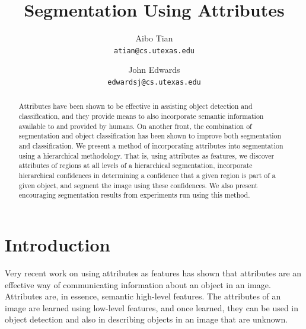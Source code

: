 \documentclass[10pt,twocolumn,letterpaper]{article}
\begin{document}
\title{Segmentation Using Attributes}

\author{Aibo Tian\\
{\tt\small atian@cs.utexas.edu}
\and
John Edwards\\
{\tt\small edwardsj@cs.utexas.edu}
}

\maketitle
\thispagestyle{empty}

\begin{abstract}
Attributes have been shown to be effective in assisting object detection and
classification, and they provide means to also incorporate semantic
information available to and provided by humans.  On another front, the
combination of segmentation and object classification has been shown to
improve both segmentation and classification.  We present a method of incorporating
attributes into segmentation using a hierarchical methodology.
That is, using attributes as features, we discover attributes of regions
at all levels of a hierarchical segmentation,
incorporate hierarchical confidences in determining a confidence that
a given region is part of a given object, and segment the image using
these confidences.  We also present encouraging segmentation results
from experiments run using this method.
\end{abstract}

\section{Introduction}
Very recent work on using attributes as features \cite{farhadi09, lampert09}
has shown that attributes are an effective way of communicating information
about an object in an image.  Attributes are, in essence, semantic high-level
features.  The attributes of an image are learned using low-level features,
and once learned, they can be used in object detection and also in describing
objects in an image that are unknown.
\end{document}

